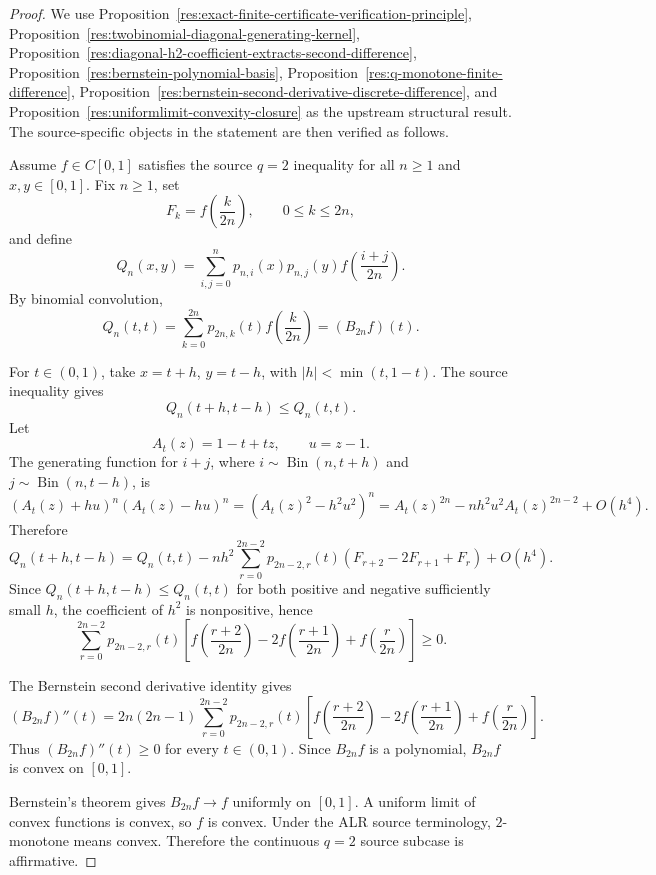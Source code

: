 \documentclass[11pt]{article}
\numberwithin{equation}{section}
\theoremstyle{definition}
\theoremstyle{remark}
\newcommand{\1}{\mathbf 1}
\begin{document}
\begin{proof}
We use Proposition~\ref{res:exact-finite-certificate-verification-principle}, Proposition~\ref{res:twobinomial-diagonal-generating-kernel}, Proposition~\ref{res:diagonal-h2-coefficient-extracts-second-difference}, Proposition~\ref{res:bernstein-polynomial-basis}, Proposition~\ref{res:q-monotone-finite-difference}, Proposition~\ref{res:bernstein-second-derivative-discrete-difference}, and Proposition~\ref{res:uniformlimit-convexity-closure} as the upstream structural result. The source-specific objects in the statement are then verified as follows.

Assume \(f\in C[0,1]\) satisfies the source \(q=2\) inequality for all \(n\ge1\) and \(x,y\in[0,1]\). Fix \(n\ge1\), set
\[
F_k=f\left(\frac{k}{2n}\right),\qquad 0\le k\le2n,
\]
and define
\[
Q_n(x,y)=\sum_{i,j=0}^{n}p_{n,i}(x)p_{n,j}(y)
f\left(\frac{i+j}{2n}\right).
\]
By binomial convolution,
\[
Q_n(t,t)=\sum_{k=0}^{2n}p_{2n,k}(t)f\left(\frac{k}{2n}\right)
=(B_{2n}f)(t).
\]

For \(t\in(0,1)\), take \(x=t+h\), \(y=t-h\), with \(|h|<\min(t,1-t)\). The source inequality gives
\[
Q_n(t+h,t-h)\le Q_n(t,t).
\]
Let
\[
A_t(z)=1-t+tz,\qquad u=z-1.
\]
The generating function for \(i+j\), where \(i\sim\operatorname{Bin}(n,t+h)\) and \(j\sim\operatorname{Bin}(n,t-h)\), is
\[
(A_t(z)+hu)^n(A_t(z)-hu)^n
=\left(A_t(z)^2-h^2u^2\right)^n
=A_t(z)^{2n}-nh^2u^2A_t(z)^{2n-2}+O(h^4).
\]
Therefore
\[
Q_n(t+h,t-h)
=Q_n(t,t)
-nh^2\sum_{r=0}^{2n-2}p_{2n-2,r}(t)
\left(F_{r+2}-2F_{r+1}+F_r\right)
+O(h^4).
\]
Since \(Q_n(t+h,t-h)\le Q_n(t,t)\) for both positive and negative sufficiently small \(h\), the coefficient of \(h^2\) is nonpositive, hence
\[
\sum_{r=0}^{2n-2}p_{2n-2,r}(t)
\left[
f\left(\frac{r+2}{2n}\right)
-2f\left(\frac{r+1}{2n}\right)
+f\left(\frac{r}{2n}\right)
\right]\ge0.
\]

The Bernstein second derivative identity gives
\[
(B_{2n}f)''(t)=2n(2n-1)
\sum_{r=0}^{2n-2}p_{2n-2,r}(t)
\left[
f\left(\frac{r+2}{2n}\right)
-2f\left(\frac{r+1}{2n}\right)
+f\left(\frac{r}{2n}\right)
\right].
\]
Thus \((B_{2n}f)''(t)\ge0\) for every \(t\in(0,1)\). Since \(B_{2n}f\) is a polynomial, \(B_{2n}f\) is convex on \([0,1]\).

Bernstein's theorem gives \(B_{2n}f\to f\) uniformly on \([0,1]\). A uniform limit of convex functions is convex, so \(f\) is convex. Under the ALR source terminology, \(2\)-monotone means convex. Therefore the continuous \(q=2\) source subcase is affirmative.
\end{proof}
\end{document}
